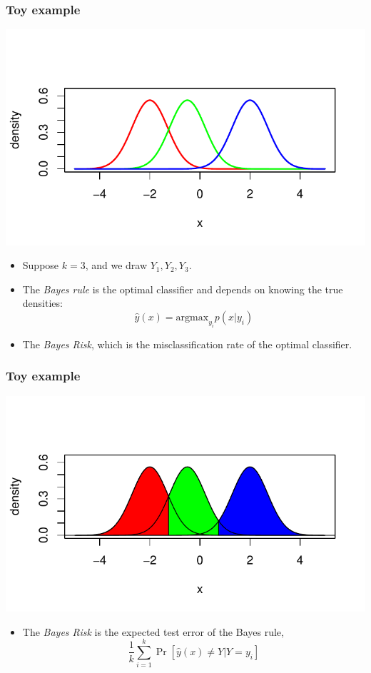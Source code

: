 \documentclass{beamer}
\begin{document}
\begin{frame}
\frametitle{Toy example}

\begin{center}
\includegraphics[scale = 0.5, clip = true, trim = 0 0.8in 0 0.8in]{../extrapolation/illus_example1a.pdf}
\end{center}

\begin{itemize}
\item Suppose $k=3$, and we draw $Y_1, Y_2, Y_3$.
\item The \emph{Bayes rule} is the optimal classifier and depends on knowing the true densities:
\[
\hat{y}(x) = \text{argmax}_{y_i} p(x|y_i)
\]
\item The \emph{Bayes Risk}, which is the misclassification rate of the optimal classifier.
\end{itemize}

\end{frame}

\begin{frame}
\frametitle{Toy example}

\begin{center}
\includegraphics[scale = 0.5, clip = true, trim = 0 0 0 0.5in]{../extrapolation/illus_example1b.pdf}
\end{center}

\begin{itemize}
\item The \emph{Bayes Risk} is the expected test error of the Bayes rule,
\[
\frac{1}{k} \sum_{i=1}^k \Pr[\hat{y}(x) \neq Y| Y = y_i]
\]
\end{itemize}

\end{frame}
\end{document}
